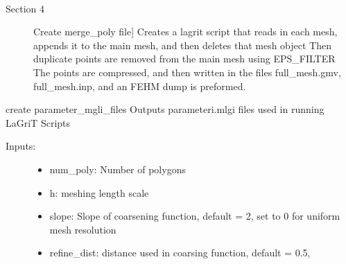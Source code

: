 \documentclass[letterpaper,10pt,english]{sphinxmanual}
\begin{document}

\begin{fulllineitems}
\label{\detokenize{pydfnworks:pydfnworks.lagrit_scripts.create_merge_poly_files}}~\begin{description}
\item[{Section 4}] \leavevmode{[}Create merge\_poly file{]}
Creates a lagrit script that reads in each mesh, appends it to the main mesh, and then deletes that mesh object
Then duplicate points are removed from the main mesh using EPS\_FILTER 
The points are compressed, and then written in the files full\_mesh.gmv, full\_mesh.inp, and an FEHM dump is preformed.

\end{description}

\end{fulllineitems}


\begin{fulllineitems}
\label{\detokenize{pydfnworks:pydfnworks.lagrit_scripts.create_parameter_mlgi_file}}
create parameter\_mgli\_files
Outputs parameteri.mlgi files used in running LaGriT Scripts
\begin{description}
\item[{Inputs:}] \leavevmode\begin{itemize}
\item {} 
num\_poly: Number of polygons

\item {} 
h: meshing length scale

\item {} 
slope: Slope of coarsening function, default = 2, 
set to 0 for uniform mesh resolution

\item {} 
refine\_dist: distance used in coarsing function, default = 0.5,

\end{itemize}

\end{description}

\end{fulllineitems}
\end{document}
